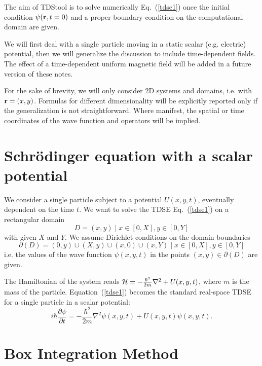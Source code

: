 \documentclass[a4paper,11pt]{article}
\begin{document}
The aim of TDStool is to solve numerically Eq.~(\ref{tdse1}) once the initial condition
$\psi({\bf r},t=0)$ and a proper boundary condition on the computational domain are given.

We will first deal with a single particle moving in a static scalar (e.g. electric) potential,
then we will generalize the discussion to include time-dependent fields. 
The effect of a time-dependent
uniform magnetic field will be added in a future version of these notes.

For the sake of brevity, we will only consider 2D systems and domains, i.e. with ${\bf r}=(x,y)$.
Formulas for different dimensionality will be explicitly reported only if the generalization
is not straightforward. Where manifest, the spatial or time coordinates of the wave function and
operators will be implied.


\section{Schr\"{o}dinger equation with a scalar potential}

We consider a single particle subject to a potential $U(x,y,t)$, eventually dependent
on the time $t$.
We want to solve the TDSE Eq.~(\ref{tdse1}) on a rectangular domain
\begin{equation}
D = (x,y) \mid x\in[0,X], y\in[0,Y]
\end{equation}
with given $X$ and $Y$.
We assume Dirichlet conditions on the domain boundaries
\begin{equation}
\partial(D) = (0,y) \cup (X,y) \cup (x,0) \cup (x,Y) \mid x\in[0,X], y\in[0,Y]
\end{equation}
i.e. the values of the wave function $\psi(x,y,t)$ in the points $(x,y)\in\partial(D)$ are given.

The Hamiltonian of the system reads $ {\cal H} = - \frac{\hbar^2}{2m}\nabla^2 + U(x,y,t) $,
where $m$ is the mass of the particle.
Equation~(\ref{tdse1}) becomes the standard real-space TDSE for a single particle in a scalar
potential:
\begin{equation} \label{tdsestatic}
i\hbar \frac{\partial \psi}{\partial t} = - \frac{\hbar^2}{2m}\nabla^2 \psi(x,y,t)
+ U(x,y,t)\psi(x,y,t) .
\end{equation}


\section{Box Integration Method}
\end{document}
